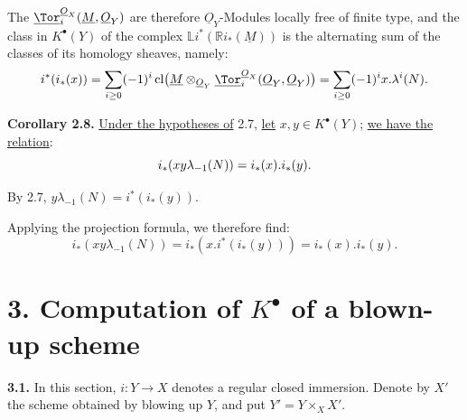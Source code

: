 The \(\underline{\Tor}_i^{\underline{O}_X}(\underline{M},\underline{O}_Y)\) are therefore \(\underline{O}_Y\)-Modules locally free of finite type, and the class in \(K^{\bullet}(Y)\) of the complex \(\mathbb L i^*(\mathbb Ri_*(\underline{M}))\) is the alternating sum of the classes of its homology sheaves, namely:
\[
i^*(i_*(x))=\sum_{i\ge0}(-1)^i
\operatorname{cl}\bigl(\underline{M}\otimes_{\underline{O}_Y}\underline{\Tor}_i^{\underline{O}_X}(\underline{O}_Y,\underline{O}_Y)\bigr)
=\sum_{i\ge0}(-1)^i x.\lambda^i(N).
\]

\textbf{Corollary 2.8.} \uline{Under the hypotheses of} 2.7, \uline{let} \(x,y\in K^{\bullet}(Y)\); \uline{we have the relation}:
\begin{equation}\notag
i_*(xy\lambda_{-1}(N))=i_*(x).i_*(y).
\end{equation}

By 2.7, \(y\lambda_{-1}(N)=i^*(i_*(y))\).

Applying the projection formula, we therefore find:
\[
i_*(xy\lambda_{-1}(N))
=i_*(x.i^*(i_*(y)))
=i_*(x).i_*(y).
\]

\section*{3. Computation of \texorpdfstring{$K^{\bullet}$}{K} of a blown-up scheme}

\textbf{3.1.} In this section, \(i:Y\to X\) denotes a regular closed immersion. Denote by \(X'\) the scheme obtained by blowing up \(Y\), and put \(Y'=Y\times_X X'\).

